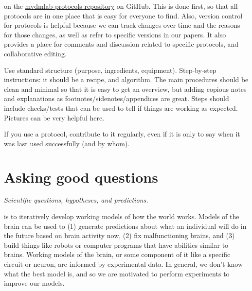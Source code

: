 \documentclass{tufte-book}
\begin{document}
 on the
\href{https://github.com/vandermeerlab/mvdmlab-protocols}{mvdmlab-protocols
  repository} on GitHub. This is
done first, so that all protocols are in one place that is easy for
everyone to find. Also, version control for protocols is helpful
because we can track changes over time and the reasons for those
changes, as well as refer to specific versions in our
papers. It
also provides a place for comments and discussion related to specific
protocols, and collaborative editing.

 Use standard structure
(purpose, ingredients, equipment). Step-by-step instructions: it
should be a recipe, and algorithm. The main procedures should be clean
and minimal so that it is easy to get an overview, but adding copious
notes and explanations as footnotes/sidenotes/appendices are
great. Steps should include checks/tests that can be used to tell if
things are working as expected. Pictures can be very helpful here.

If you use a protocol, contribute to it regularly, even if it is only
to say when it was last used successfully (and by whom).

\section{Asking good questions}

{\it Scientific questions, hypotheses, and predictions.}

 is to iteratively
develop working models of how the world works. Models of the brain can
be used to (1) generate predictions about what an individual will do
in the future based on brain activity now, (2) fix malfunctioning
brains, and (3) build things like robots or computer programs that
have abilities similar to brains. Working models of the brain, or some
component of it like a specific circuit or neuron, are informed by
experimental data. In general, we don't know what the best model
is, and so we are motivated to perform experiments to
improve our models.
\end{document}
